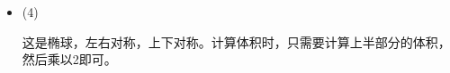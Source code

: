 \documentclass{article}
\begin{document}
\begin{itemize}
        综上，
        \begin{align*}
          V  = & \pi \int_{0}^{\frac{\pi}{2}} |y^2(\theta) x'(\theta)| d\theta
          + \pi \int_{\frac{\pi}{2}}^{\frac{2\pi}{3}} |y^2(\theta) x'(\theta)| d\theta
          - \pi \int_{\frac{2\pi}{3}}^{\pi} |y^2(\theta) x'(\theta)| d\theta                                                          \\
          =    & \pi \int_{0}^{\frac{2\pi}{3}} y^2(\theta) |x'(\theta)| d\theta
          - \pi \int_{\frac{2\pi}{3}}^{\pi} y^2(\theta) |x'(\theta)| d\theta                                                          \\
          =    & \pi \int_{0}^{\frac{2\pi}{3}} a^2 (1 + cos \theta)^2 sin^2 \theta |a(-sin\theta - 2cos\theta sin\theta)| d\theta     \\
               & - \pi \int_{\frac{2\pi}{3}}^{\pi} a^2 (1 + cos \theta)^2 sin^2 \theta |a(-sin\theta - 2cos\theta sin\theta)| d\theta \\
          =    & \pi \int_{0}^{\frac{2\pi}{3}} a^2 (1 + cos \theta)^2 sin^2 \theta [a(sin\theta + 2cos\theta sin\theta)] d\theta      \\
               & - \pi \int_{\frac{2\pi}{3}}^{\pi} a^2 (1 + cos \theta)^2 sin^2 \theta [a(-sin\theta - 2cos\theta sin\theta)] d\theta \\
          =    & \frac{8}{3} a^3 \pi
        \end{align*}
        两个绝对值是如何去掉的：
        \begin{itemize}
          \item 在$\theta : 0 \to \frac{2\pi}{3}$时，由图像可知$x$是递减的，所以$x'(\theta) \leq 0$；
          \item 在$\theta : \frac{2\pi}{3} \to \pi$时，由图像可知$x$是递增的，所以$x'(\theta) \geq 0$.
        \end{itemize}

        定积分的具体计算步骤，我省略了，最终结果是通过计算软件求出的。

  \item (4)

        这是椭球，左右对称，上下对称。计算体积时，只需要计算上半部分的体积，然后乘以2即可。


\end{itemize}
\end{document}
